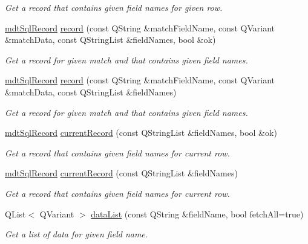 \begin{DoxyCompactItemize}
\begin{DoxyCompactList}\small\item\em Get a record that contains given field names for given row. \end{DoxyCompactList}\item 
\hyperlink{classmdt_sql_record}{mdt\-Sql\-Record} \hyperlink{classmdt_abstract_sql_table_controller_a9b83c25b5b8027bef36ab314be0b2a1c}{record} (const Q\-String \&match\-Field\-Name, const Q\-Variant \&match\-Data, const Q\-String\-List \&field\-Names, bool \&ok)
\begin{DoxyCompactList}\small\item\em Get a record for given match and that contains given field names. \end{DoxyCompactList}\item 
\hyperlink{classmdt_sql_record}{mdt\-Sql\-Record} \hyperlink{classmdt_abstract_sql_table_controller_a074c3b2a60e38acff2f754c6f2b787d8}{record} (const Q\-String \&match\-Field\-Name, const Q\-Variant \&match\-Data, const Q\-String\-List \&field\-Names)
\begin{DoxyCompactList}\small\item\em Get a record for given match and that contains given field names. \end{DoxyCompactList}\item 
\hyperlink{classmdt_sql_record}{mdt\-Sql\-Record} \hyperlink{classmdt_abstract_sql_table_controller_a68a9b5aa1baa7ed556c14111b07dd57a}{current\-Record} (const Q\-String\-List \&field\-Names, bool \&ok)
\begin{DoxyCompactList}\small\item\em Get a record that contains given field names for current row. \end{DoxyCompactList}\item 
\hyperlink{classmdt_sql_record}{mdt\-Sql\-Record} \hyperlink{classmdt_abstract_sql_table_controller_a0f397fe1d28fe99360a31479c023629f}{current\-Record} (const Q\-String\-List \&field\-Names)
\begin{DoxyCompactList}\small\item\em Get a record that contains given field names for current row. \end{DoxyCompactList}\item 
Q\-List$<$ Q\-Variant $>$ \hyperlink{classmdt_abstract_sql_table_controller_a46896c6920f306f2c2ad03281ec64c74}{data\-List} (const Q\-String \&field\-Name, bool fetch\-All=true)
\begin{DoxyCompactList}\small\item\em Get a list of data for given field name. \end{DoxyCompactList}\item 

\end{DoxyCompactItemize}
